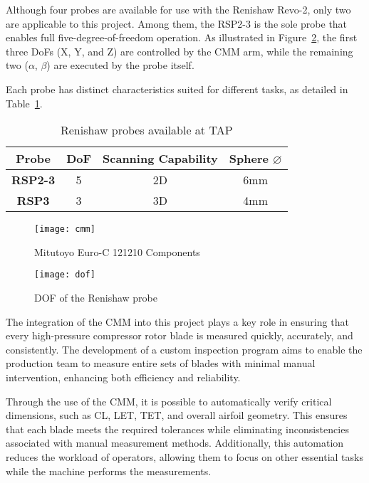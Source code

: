 Although four probes are available for use with the Renishaw Revo-2, only two are applicable to this project. Among them, the RSP2-3 is the sole probe that enables full five-degree-of-freedom operation. As illustrated in Figure~\ref{fig:dof}, the first three DoFs (X, Y, and Z) are controlled by the \gls{CMM} arm, while the remaining two ($\alpha$, $\beta$) are executed by the probe itself.

Each probe has distinct characteristics suited for different tasks, as detailed in Table~\ref{tab:probes}.


\begin{table}[ht]
    \caption{Renishaw probes available at TAP}
    \label{tab:probes}
    \centering
    \begin{tabular}{cccc}
    \toprule
    \textbf{Probe} & DoF & Scanning Capability & Sphere $\varnothing$ \\ \hline
    \textbf{RSP2-3} &  5 & 2D & 6mm \\ \hline
    \textbf{RSP3}  & 3 & 3D & 4mm \\ \hline
\end{tabular}
\end{table} 

\begin{figure}[H]
    \centering
    \texttt{[image: cmm]}
    \caption{Mitutoyo Euro-C 121210 Components \cite{Shi2023}}
    \label{fig:cmm}
\end{figure}

\begin{figure}[H]
    \centering
    \texttt{[image: dof]}
    \caption{DOF of the Renishaw probe \cite{renishaw2025}}
    \label{fig:dof}
\end{figure}

The integration of the \gls{CMM} into this project plays a key role in ensuring that every high-pressure compressor rotor blade is measured quickly, accurately, and consistently. The development of a custom inspection program aims to enable the production team to measure entire sets of blades with minimal manual intervention, enhancing both efficiency and reliability.

Through the use of the \gls{CMM}, it is possible to automatically verify critical dimensions, such as \gls{CL}, \gls{LET}, \gls{TET}, and overall airfoil geometry. This ensures that each blade meets the required tolerances while eliminating inconsistencies associated with manual measurement methods. Additionally, this automation reduces the workload of operators, allowing them to focus on other essential tasks while the machine performs the measurements.

